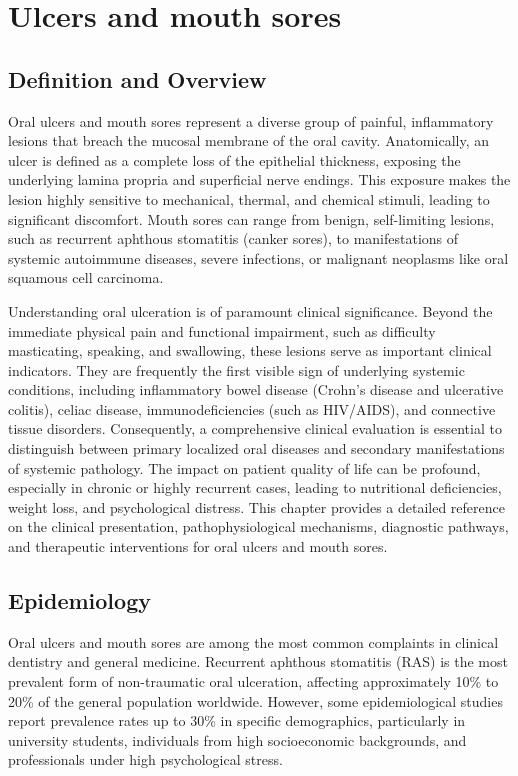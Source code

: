 \chapter{Ulcers and mouth sores}

\section*{Definition and Overview}
Oral ulcers and mouth sores represent a diverse group of painful, inflammatory lesions that breach the mucosal membrane of the oral cavity. Anatomically, an ulcer is defined as a complete loss of the epithelial thickness, exposing the underlying lamina propria and superficial nerve endings. This exposure makes the lesion highly sensitive to mechanical, thermal, and chemical stimuli, leading to significant discomfort. Mouth sores can range from benign, self-limiting lesions, such as recurrent aphthous stomatitis (canker sores), to manifestations of systemic autoimmune diseases, severe infections, or malignant neoplasms like oral squamous cell carcinoma.

Understanding oral ulceration is of paramount clinical significance. Beyond the immediate physical pain and functional impairment, such as difficulty masticating, speaking, and swallowing, these lesions serve as important clinical indicators. They are frequently the first visible sign of underlying systemic conditions, including inflammatory bowel disease (Crohn's disease and ulcerative colitis), celiac disease, immunodeficiencies (such as HIV/AIDS), and connective tissue disorders. Consequently, a comprehensive clinical evaluation is essential to distinguish between primary localized oral diseases and secondary manifestations of systemic pathology. The impact on patient quality of life can be profound, especially in chronic or highly recurrent cases, leading to nutritional deficiencies, weight loss, and psychological distress. This chapter provides a detailed reference on the clinical presentation, pathophysiological mechanisms, diagnostic pathways, and therapeutic interventions for oral ulcers and mouth sores.

\section*{Epidemiology}
Oral ulcers and mouth sores are among the most common complaints in clinical dentistry and general medicine. Recurrent aphthous stomatitis (RAS) is the most prevalent form of non-traumatic oral ulceration, affecting approximately 10\% to 20\% of the general population worldwide. However, some epidemiological studies report prevalence rates up to 30\% in specific demographics, particularly in university students, individuals from high socioeconomic backgrounds, and professionals under high psychological stress.

